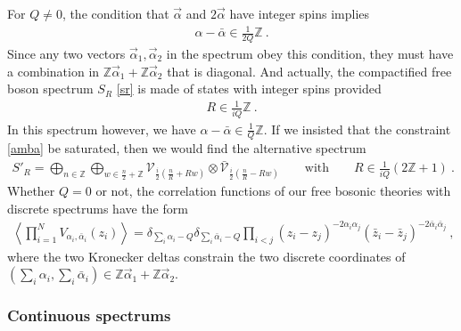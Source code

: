 \documentclass[12pt, a4paper, notitlepage, twoside]{report}
\numberwithin{equation}{section}
\theoremstyle{break}
\begin{document}
For $Q\neq 0$, the condition that $\vec\alpha$ and $2\vec\alpha$ have integer spins implies 
\begin{align}
 \alpha-\bar\alpha\in \frac{1}{2Q}\mathbb{Z}\ .
 \label{amba}
\end{align}
Since any two vectors $\vec\alpha_1,\vec\alpha_2$ in the spectrum obey this condition, they must have a combination in $\mathbb{Z}\vec\alpha_1 + \mathbb{Z}\vec\alpha_2$ that is diagonal. And actually, the compactified free boson spectrum $S_R$ \eqref{sr} is made of states with integer spins provided
\begin{align}
 R \in \frac{1}{iQ}\mathbb{Z}\ .
 \label{riqz}
\end{align}
In this spectrum however, we have $\alpha-\bar\alpha\in\frac{1}{Q}\mathbb{Z}$. 
If we insisted that the constraint \eqref{amba} be saturated, then we would find the alternative spectrum
\begin{align}
 S'_R = \bigoplus_{n\in \mathbb{Z}} \bigoplus_{w\in \frac{n}{2}+\mathbb{Z}} \mathcal{V}_{\frac{i}{2}\left(\frac{n}{R} + Rw\right)} \otimes \bar{\mathcal{V}}_{\frac{i}{2}\left(\frac{n}{R} - Rw\right)} \qquad \text{with}\qquad R \in \frac{1}{iQ}(2\mathbb{Z}+1)\ .
\end{align}
Whether $Q=0$ or not, the correlation functions of our free bosonic theories with discrete spectrums have the form
\begin{align}
 \left\langle \prod_{i=1}^N V_{\alpha_i,\bar\alpha_i}(z_i) \right\rangle = 
 \delta_{\sum_i \alpha_i-Q} \delta_{\sum_i\bar\alpha_i-Q} 
 \prod_{i<j} (z_i-z_j)^{-2\alpha_i\alpha_j}(\bar{z}_i-\bar{z}_j)^{-2\bar{\alpha}_i\bar{\alpha}_j}\ , 
\end{align}
where the two Kronecker deltas constrain the two discrete coordinates of $(\sum_i\alpha_i,\sum_i\bar\alpha_i)\in \mathbb{Z}\vec\alpha_1 + \mathbb{Z}\vec\alpha_2$.

\subsubsection{Continuous spectrums}
\end{document}
